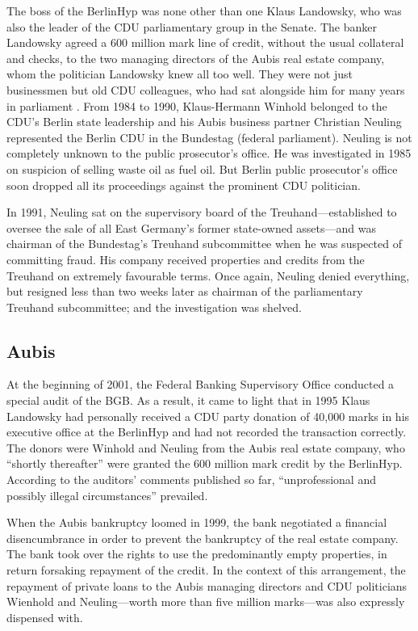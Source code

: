 \documentclass[PRMIA4A.tex]{subfiles}
\begin{document}
The boss of the BerlinHyp was none other than one Klaus Landowsky, who was also the leader of the CDU parliamentary group in the Senate. The banker Landowsky agreed a 600 million mark line of credit, without the usual collateral and checks, to the two managing directors of the Aubis real estate company, whom the politician Landowsky knew all too well. They were not just businessmen but old CDU colleagues, who had sat alongside him for many years in parliament
.
From 1984 to 1990, Klaus-Hermann Winhold belonged to the CDU’s Berlin state leadership and his Aubis business partner Christian Neuling represented the Berlin CDU in the Bundestag (federal parliament). Neuling is not completely unknown to the public prosecutor’s office. He was investigated in 1985 on suspicion of selling waste oil as fuel oil. But Berlin public prosecutor’s office soon dropped all its proceedings against the prominent CDU politician.

In 1991, Neuling sat on the supervisory board of the Treuhand—established to oversee the sale of all East Germany’s former state-owned assets—and was chairman of the Bundestag’s Treuhand subcommittee when he was suspected of committing fraud. His company received properties and credits from the Treuhand on extremely favourable terms. Once again, Neuling denied everything, but resigned less than two weeks later as chairman of the parliamentary Treuhand subcommittee; and the investigation was shelved.

\subsection*{Aubis}

At the beginning of 2001, the Federal Banking Supervisory Office conducted a special audit of the BGB. As a result, it came to light that in 1995 Klaus Landowsky had personally received a CDU party donation of 40,000 marks in his executive office at the BerlinHyp and had not recorded the transaction correctly. The donors were Winhold and Neuling from the Aubis real estate company, who “shortly thereafter” were granted the 600 million mark credit by the BerlinHyp. According to the auditors’ comments published so far, “unprofessional and possibly illegal circumstances” prevailed.

When the Aubis bankruptcy loomed in 1999, the bank negotiated a financial disencumbrance in order to prevent the bankruptcy of the real estate company. The bank took over the rights to use the predominantly empty properties, in return forsaking repayment of the credit. In the context of this arrangement, the repayment of private loans to the Aubis managing directors and CDU politicians Wienhold and Neuling—worth more than five million marks—was also expressly dispensed with.
\end{document}
